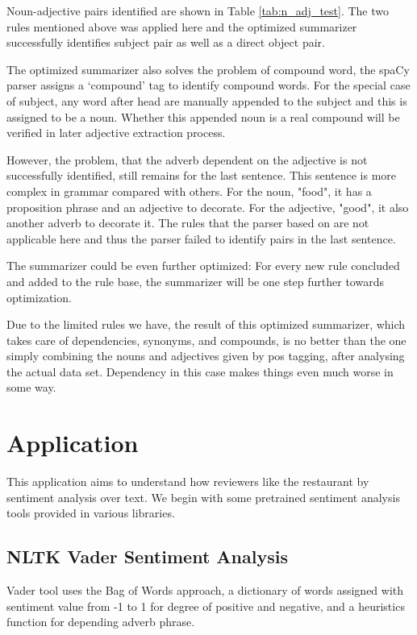 \documentclass[sigconf]{acmart}
\begin{document}
Noun-adjective pairs identified are shown in Table \ref{tab:n_adj_test}. The two rules mentioned above was applied here and the optimized summarizer successfully identifies subject pair as well as a direct object pair. 

The optimized summarizer also solves the problem of compound word, the spaCy parser assigns a ‘compound’ tag to identify compound words. For the special case of subject, any word after head are manually appended to the subject and this is assigned to be a noun. Whether this appended noun is a real compound will be verified in later adjective extraction process.

However, the problem, that the adverb dependent on the adjective is not successfully identified, still remains for the last sentence. This sentence is more complex in grammar compared with others. For the noun, "food", it has a proposition phrase and an adjective to decorate. For the adjective, "good", it also another adverb to decorate it. The rules that the parser based on are not applicable here and thus the parser failed to identify pairs in the last sentence. 

The summarizer could be even further optimized: For every new rule concluded and added to the rule base, the summarizer will be one step further towards optimization. 

Due to the limited rules we have, the result of this optimized summarizer, which takes care of dependencies, synonyms, and compounds, is no better than the one simply combining the nouns and adjectives given by pos tagging, after analysing the actual data set. Dependency in this case makes things even much worse in some way. 

\section{Application}
This application aims to understand how reviewers like the restaurant by sentiment analysis over text. We begin with some pretrained sentiment analysis tools provided in various libraries.  

\subsection{NLTK Vader Sentiment Analysis}

Vader tool\cite{Vader} uses the Bag of Words approach, a dictionary of words assigned with sentiment value from -1 to 1 for degree of positive and negative, and a heuristics function for depending adverb phrase. 
\end{document}
